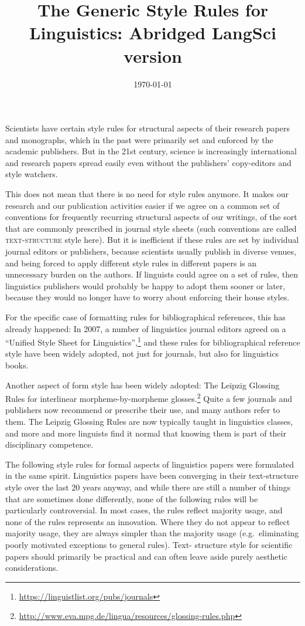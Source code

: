 \documentclass[a4paper]{article}
\date{\today}
\title{The Generic Style Rules for Linguistics: Abridged LangSci version}
\begin{document}
\maketitle 

Scientists have
certain style rules for structural aspects of their research papers and
monographs, which in the past were primarily set and enforced by the
academic publishers. But in the 21st century, science is increasingly
international and research papers spread easily even without the
publishers' copy-editors and style watchers. 

This does not mean that
there is no need for style rules anymore. It makes our research and our
publication activities easier if we agree on a common set of conventions
for frequently recurring structural aspects of our writings, of the sort
that are commonly prescribed in journal style sheets (such conventions
are called \textsc{text-structure} style here). But it is inefficient if these
rules are set by individual journal editors or publishers, because
scientists usually publish in diverse venues, and being forced to apply
different style rules in different papers is an unnecessary burden on
the authors. If linguists could agree on a set of rules, then
linguistics publishers would probably be happy to adopt them sooner or
later, because they would no longer have to worry about enforcing their
house styles. 

For the specific case of formatting rules for
bibliographical references, this has already happened: In 2007, a number
of linguistics journal editors agreed on a ``Unified Style Sheet for
Linguistics'',\footnote{\url{https://linguistlist.org/pubs/journals}} and these rules for
bibliographical reference style have been widely adopted, not just for
journals, but also for linguistics books. 

Another aspect of form style
has been widely adopted: The Leipzig Glossing Rules for interlinear
morpheme-by-morpheme glosses.\footnote{\url{http://www.eva.mpg.de/lingua/resources/glossing-rules.php}}
Quite a few
journals and publishers now recommend or prescribe their use, and many
authors refer to them. The Leipzig Glossing Rules are now typically
taught in linguistics classes, and more and more linguists find it
normal that knowing them is part of their disciplinary competence. 

The following style rules for formal aspects of linguistics papers were
formulated in the same spirit. Linguistics papers have been converging
in their text-structure style over the last 20 years anyway, and while
there are still a number of things that are sometimes done differently,
none of the following rules will be particularly controversial. In most
cases, the rules reflect majority usage, and none of the rules
represents an innovation. Where they do not appear to reflect majority
usage, they are always simpler than the majority usage (e.g.~eliminating
poorly motivated exceptions to general rules). Text- structure style for
scientific papers should primarily be practical and can often leave
aside purely aesthetic considerations. 
\end{document}
